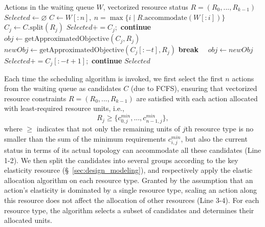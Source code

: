 \begin{algorithm}[t!]
\label{alg:ersa}
    \begin{footnotesize}
    \begin{algorithmic}[1]
        \Require Actions in the waiting queue $W$, vectorized resource status $R = (R_0, ..., R_{k-1})$
        \State $Selected \gets \varnothing$
        \State $C \gets W[:n],~n=\max\{i \mid R.\text{accommodate}(W[:i])\}$ 
         
            \State $C_j \gets C.\text{split}(R_j)$
             
            \State $Selected+= C_j$;~\textbf{continue} 
            \EndIf
            \State $obj \gets \text{getApproximatedObjective}(C_j, R_j)$ 
             
            \State $newObj \gets \text{getApproximatedObjective}(C_j[:-t], R_j)$
             \textbf{break}
            \Else~~$obj \gets newObj$
            \EndIf
            \EndFor
            \State $Selected += C_j[:-t+1]$;~\textbf{continue} 
        \EndFor
        \Return $Selected$
    \end{algorithmic}
    \end{footnotesize}
\end{algorithm}


Each time the scheduling algorithm is invoked, we first select the first $n$ actions from the waiting queue as candidates $C$ (due to FCFS), ensuring that vectorized resource constraints $R = (R_0, ..., R_{k-1})$ are satisfied with each action allocated with least-required resource units, i.e.,
$$
R_j \ge \{c_{0,j}^{min}, ...,c_{n-1,j}^{min}\},
$$
where $\ge$ indicates that not only the remaining units of $j$th resource type is no smaller than the sum of the minimum requirements $c_{i,j}^{min}$, but also the current status in terms of its actual topology can accommodate all these candidates (Line 1-2).
We then split the candidates into several groups according to the key elasticity resource (\S~\ref{sec:design_modeling}), and respectively apply the elastic allocation algorithm on each resource type. Granted by the assumption that an action’s elasticity is dominated by a single resource type, scaling an action along this resource does not affect the allocation of other resources (Line 3-4).
For each resource type, the algorithm selects a subset of candidates and determines their allocated units.


